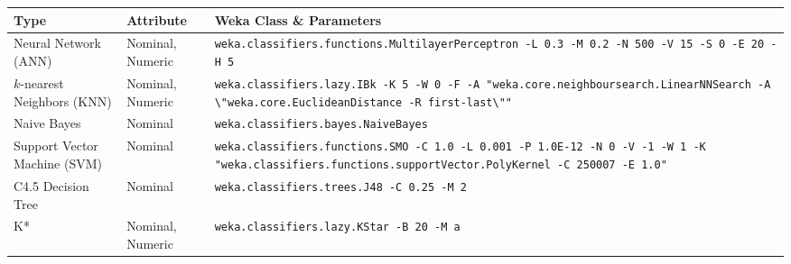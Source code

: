 \documentclass[../thesis/thesis.tex]{subfiles}
\begin{document}
\begin{table}[h]
\centering
\begin{tabular}{|p{40mm}|p{20mm}|p{70mm}|}
\hline
\textbf{Type} & \textbf{Attribute} & \textbf{Weka Class} \& \textbf{Parameters} \\ \hline

{Neural Network \newline (ANN)} & {Nominal, \newline Numeric} & \texttt{weka.classifiers.functions\newline.MultilayerPerceptron \newline -L 0.3 -M 0.2 -N 500 -V 15 \newline -S 0 -E 20 -H 5} \\ \hline

{$k$-nearest Neighbors \newline (KNN)} & Nominal, \newline Numeric & \texttt{weka.classifiers.lazy.IBk \newline -K 5 -W 0 -F \newline -A "weka.core.neighboursearch\newline.LinearNNSearch -A \textbackslash"weka.core\newline.EuclideanDistance \newline -R first-last\textbackslash""} \\ \hline

Naive Bayes & Nominal & \texttt{weka.classifiers.bayes.NaiveBayes} \\ \hline

{Support Vector \newline Machine (SVM)} & Nominal & \texttt{weka.classifiers.functions.SMO \newline -C 1.0 -L 0.001 -P 1.0E-12 \newline -N 0 -V -1 -W 1 \newline -K "weka.classifiers.functions\newline.supportVector.PolyKernel \newline-C 250007 -E 1.0"} \\ \hline

{C4.5 \newline Decision Tree} & Nominal & \texttt{weka.classifiers.trees.J48 \newline -C 0.25 -M 2} \\ \hline

K* & Nominal, \newline Numeric & \texttt{weka.classifiers.lazy.KStar \newline -B 20 -M a} \\ \hline %


\end{tabular}
\end{table}
\end{document}
